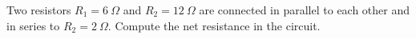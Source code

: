 Two resistors $R_1 = 6 \ \Omega$ and $R_2 = 12 \ \Omega$
are connected in parallel
to each other and in series to $R_2 = 2 \ \Omega$.
Compute the net resistance in the circuit.